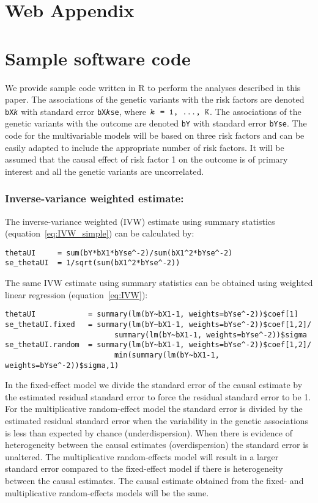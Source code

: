 \documentclass[a4paper,12pt]{article}
\begin{document}
\section*{Web Appendix}

\section{Sample software code}
\normalsize{We provide sample code written in R to perform the analyses described in this paper.  The associations of the genetic variants with the risk factors are denoted \texttt{bX\textit{k}} with standard error \texttt{bX\textit{k}se}, where $\texttt{\textit{k} = 1, \ldots, K}$. The associations of the genetic variants with the outcome are denoted \texttt{bY} with standard error \texttt{bYse}. The code for the multivariable models will be based on three risk factors and can be easily adapted to include the appropriate number of risk factors. It will be assumed that the causal effect of risk factor 1 on the outcome is of primary interest and all the genetic variants are uncorrelated.}

\subsubsection*{Inverse-variance weighted estimate:}
\normalsize{The inverse-variance weighted (IVW) estimate using summary statistics (equation~\ref{eq:IVW_simple}) can be calculated by:}

\scriptsize{
\begin{verbatim}
thetaUI     = sum(bY*bX1*bYse^-2)/sum(bX1^2*bYse^-2)
se_thetaUI  = 1/sqrt(sum(bX1^2*bYse^-2))
\end{verbatim}
}

\normalsize{The same IVW estimate using summary statistics can be obtained using weighted linear regression (equation~\ref{eq:IVW}):}

\scriptsize{
\begin{verbatim}
thetaUI            = summary(lm(bY~bX1-1, weights=bYse^-2))$coef[1]
se_thetaUI.fixed   = summary(lm(bY~bX1-1, weights=bYse^-2))$coef[1,2]/
                         summary(lm(bY~bX1-1, weights=bYse^-2))$sigma
se_thetaUI.random  = summary(lm(bY~bX1-1, weights=bYse^-2))$coef[1,2]/
                         min(summary(lm(bY~bX1-1, weights=bYse^-2))$sigma,1)
\end{verbatim}
}
\normalsize{In the fixed-effect model we divide the standard error of the causal estimate by the estimated residual standard error to force the residual standard error to be 1. For the multiplicative random-effect model the standard error is divided by the estimated residual standard error when the variability in the genetic associations is less than expected by chance (underdispersion). When there is evidence of heterogeneity between the causal estimates (overdispersion) the standard error is unaltered. The multiplicative random-effects model will result in a larger standard error compared to the fixed-effect model if there is heterogeneity between the causal estimates.}  The causal estimate obtained from the fixed- and multiplicative random-effects models will be the same.
\end{document}

